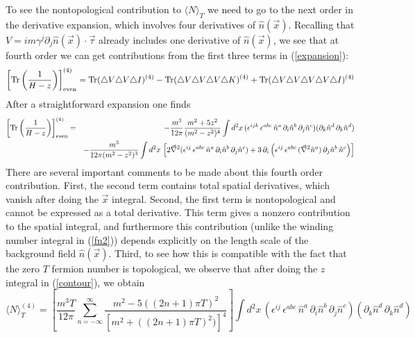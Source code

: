 \documentclass[a4paper,prd]{revtex4}
\begin{document}
To see the nontopological contribution to $\langle N\rangle_T$ we need
to go to the next order in the derivative expansion, which involves
four derivatives of $\hat{n}(\vec{x})$. Recalling that
$V=im\gamma^{j}\partial_{j}\hat{n}(\vec{x})\cdot\vec{\tau}$ already
includes one derivative of $\hat{n}(\vec{x})$, we see that at fourth
order we can get contributions from the first three terms in
(\ref{expansion}):
\begin{equation}
\left[\textrm{Tr}\left(\frac{1}{H-z}\right)\right]_{\rm{even}}^{(4)}=\textrm{Tr}(\triangle
V \triangle  V \triangle I)^{(4)}-\textrm{Tr}(\triangle V \triangle V
\triangle V \triangle K)^{(4)} +\textrm{Tr}(\triangle V \triangle V
\triangle V \triangle V \triangle I)^{(4)} 
\label{expansion4}
\end{equation}
After a straightforward expansion one finds
\begin{eqnarray}
\left[\textrm{Tr}\left(\frac{1}{H-z}\right)\right]_{\rm{even}}^{(4)} &
= & -\frac{m^{3}}{12 \pi} \frac{m^{2}+ 5z^{2}}{(m^{2}-z^{2})^{4}} \int
d^{2}x\,(\epsilon^{ijk}\, \epsilon^{abc}\,
\hat{n}^{a}\,\partial_i\hat{n}^{b}\,\partial_j\hat{n}^{c})(\partial_k\hat{n}^{d}\,\partial_k\hat{n}^{d})
\nonumber \\ & & - \frac{m^{3}}{12 \pi(m^{2}-z^{2})^{3}}\int d^{2}x\,
\left[2\vec{\nabla}^{2}(\epsilon^{ij}\, \epsilon^{abc}\, \hat{n}^{a}\, \partial_i \hat{n}^{b}\,
\partial_j \hat{n}^{c})  +3\,\partial_i\left(\epsilon^{ij}\, \epsilon^{abc}\,
(\vec{\nabla}^{2}\hat{n}^{a})\,\partial_j\hat{n}^{b}\,\hat{n}^{c}\right)\right]
\label{derivative4}
\end{eqnarray}
There are several important comments to be made about this fourth order 
contribution. First, the second term contains total spatial 
derivatives, which vanish after doing the $\vec{x}$ integral. Second,
the first term is nontopological and cannot be expressed as a total
derivative. This term gives a nonzero contribution to the spatial
integral, and furthermore this contribution (unlike the winding number
integral in (\ref{fn2})) depends explicitly on the length scale of the
background field
$\hat{n}(\vec{x})$. Third, to see how this is compatible with the fact that the zero
$T$ fermion number is topological, we observe that after doing the $z$
integral in (\ref{contour}), we obtain
\begin{equation}
\langle N\rangle _T^{(4)}=\left[\frac{m^3 T}{12 \pi} \sum_{n=-\infty}^\infty 
\frac{m^2 -5((2n+1)\pi T)^2}{[m^2 +((2n+1)\pi T)^2)]^4}\right]\int d^{2}x\,(\epsilon^{ij}\,
\epsilon^{abc}\, \hat{n}^{a}\, \partial_i\hat{n}^{b}\, \partial_j \hat{n}^{c})(\partial_k
\hat{n}^{d}\, \partial_k \hat{n}^{d})
\label{nt4}
\end{equation}
\end{document}
